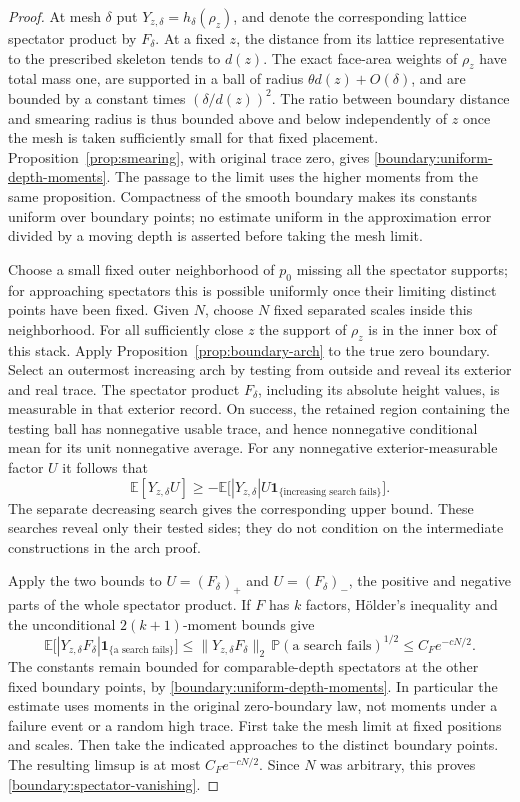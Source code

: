 \documentclass[11pt]{article}
\theoremstyle{definition}
\theoremstyle{remark}
\numberwithin{equation}{section}
\begin{document}
\begin{proof}
At mesh $\delta$ put $Y_{z,\delta}=h_\delta(\rho_z)$, and denote the
corresponding lattice spectator product by $F_\delta$.
At a fixed $z$, the distance from its lattice representative to the
prescribed skeleton tends to $d(z)$.  The exact face-area weights
of $\rho_z$ have total mass one, are supported in a ball of radius
$\theta d(z)+O(\delta)$, and are bounded by a constant times
$(\delta/d(z))^2$.  The ratio between boundary distance and smearing
radius is thus bounded above and below independently of $z$ once
the mesh is taken sufficiently small for that fixed placement.
Proposition~\ref{prop:smearing}, with original trace zero, gives
\eqref{boundary:uniform-depth-moments}.  The passage to the limit
uses the higher moments from the same proposition.  Compactness
of the smooth boundary makes its constants uniform over boundary
points; no estimate uniform in the approximation error divided by
a moving depth is asserted before taking the mesh limit.

Choose a small fixed outer neighborhood of $p_0$ missing all the
spectator supports; for approaching spectators this is possible
uniformly once their limiting distinct points have been fixed.
Given $N$, choose $N$ fixed separated scales inside this neighborhood.
For all sufficiently close $z$ the support of $\rho_z$ is in the
inner box of this stack.  Apply
Proposition~\ref{prop:boundary-arch} to the true zero boundary.
Select an outermost increasing arch by testing from outside and
reveal its exterior and real trace.  The spectator product $F_\delta$,
including its absolute height values, is measurable in that exterior
record.  On success, the retained region containing the testing
ball has nonnegative usable trace, and hence nonnegative conditional
mean for its unit nonnegative average.  For any nonnegative
exterior-measurable factor $U$ it follows that
\[
 \mathbb E[Y_{z,\delta}U]
 \ge -\mathbb E\big[|Y_{z,\delta}|U\mathbf 1_{\{\text{increasing search fails}\}}\big].
\]
The separate decreasing search gives the corresponding upper bound.
These searches reveal only their tested sides; they do not
condition on the intermediate constructions in the arch proof.

Apply the two bounds to $U=(F_\delta)_+$ and $U=(F_\delta)_-$, the positive and
negative parts of the whole spectator product.  If $F$ has $k$
factors, H\"older's inequality and the unconditional
$2(k+1)$-moment bounds give
\[
 \mathbb E\big[|Y_{z,\delta}F_\delta|\mathbf 1_{\{\text{a search fails}\}}\big]
 \le \|Y_{z,\delta}F_\delta\|_2\,
       \mathbb P(\text{a search fails})^{1/2}
 \le C_F e^{-cN/2}.
\]
The constants remain bounded for comparable-depth spectators at
the other fixed boundary points, by
\eqref{boundary:uniform-depth-moments}.  In particular the estimate
uses moments in the original zero-boundary law, not moments under
a failure event or a random high trace.  First take the mesh limit
at fixed positions and scales.  Then take the indicated approaches
to the distinct boundary points.  The resulting limsup is at most
$C_F e^{-cN/2}$.  Since $N$ was arbitrary, this proves
\eqref{boundary:spectator-vanishing}.


\end{proof}
\end{document}
